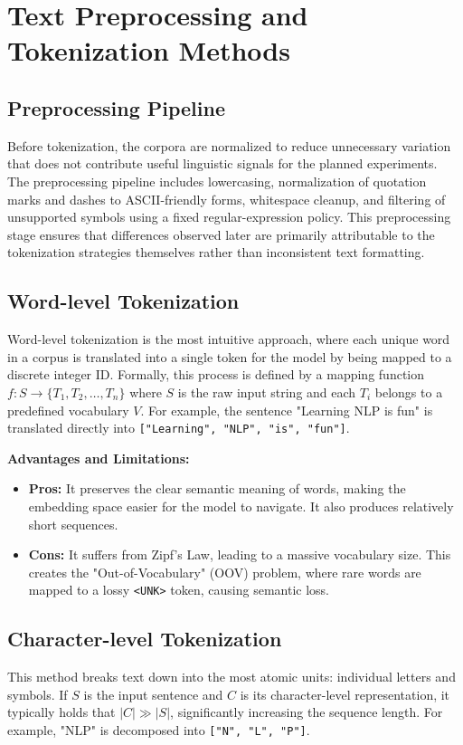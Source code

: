 \section{Text Preprocessing and Tokenization Methods}

\subsection{Preprocessing Pipeline}
Before tokenization, the corpora are normalized to reduce unnecessary variation that does not contribute useful linguistic signals for the planned experiments. The preprocessing pipeline includes lowercasing, normalization of quotation marks and dashes to ASCII-friendly forms, whitespace cleanup, and filtering of unsupported symbols using a fixed regular-expression policy. This preprocessing stage ensures that differences observed later are primarily attributable to the tokenization strategies themselves rather than inconsistent text formatting.

\subsection{Word-level Tokenization}
Word-level tokenization is the most intuitive approach, where each unique word in a corpus is translated into a single token for the model by being mapped to a discrete integer ID. Formally, this process is defined by a mapping function $f: S \rightarrow \{T_1, T_2, \dots, T_n\}$ where $S$ is the raw input string and each $T_i$ belongs to a predefined vocabulary $V$. For example, the sentence "Learning NLP is fun" is translated directly into \texttt{["Learning", "NLP", "is", "fun"]}.

\textbf{Advantages and Limitations:}
\begin{itemize}
    \item \textbf{Pros:} It preserves the clear semantic meaning of words, making the embedding space easier for the model to navigate. It also produces relatively short sequences.
    \item \textbf{Cons:} It suffers from Zipf's Law, leading to a massive vocabulary size. This creates the "Out-of-Vocabulary" (OOV) problem, where rare words are mapped to a lossy \texttt{<UNK>} token, causing semantic loss.
\end{itemize}

\subsection{Character-level Tokenization}
This method breaks text down into the most atomic units: individual letters and symbols. If $S$ is the input sentence and $C$ is its character-level representation, it typically holds that $|C| \gg |S|$, significantly increasing the sequence length. For example, "NLP" is decomposed into \texttt{["N", "L", "P"]}.


